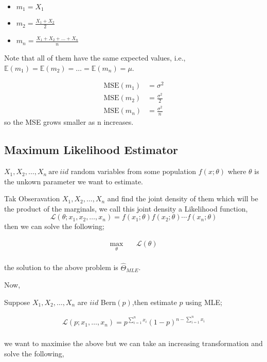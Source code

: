 \documentclass[12pt,a4paper]{article}
\begin{document}
    \begin{itemize}
        \item  \(m_{1}=X_{1}\)
        \item \(m_{2}=\frac{X_{1}+X_{2}}{2}\)
        \item \(m_{n}=\frac{X_{1}+X_{2}+\ldots +X_{n}}{n}\)
    \end{itemize}
    

    Note that all of them have the same expected values, i.e., \(\mathbb{E}(m_{1})=\mathbb{E}(m_{2})=\ldots=\mathbb{E}(m_{n})=\mu\). 
    
    \begin{align*}
        \mathrm{MSE}(m_{1})&=\sigma^2\\
        \mathrm{MSE}(m_{2})&=\frac{\sigma^2}{2}\\
        \mathrm{MSE}(m_{n})&=\frac{\sigma^2}{n}
    \end{align*}
    so the MSE grows smaller as n increases. 
   

    \subsection{Maximum Likelihood Estimator}
    \(X_{1},X_{2},\ldots,X_{n} \ \text{are} \ iid\) random variables from some population \(f(x;\theta )\) where \(\theta\) is the unkown parameter we want to estimate. 
    
    Tak Obseravation \( X_{1},X_{2},\ldots,X_{n}\)  and find the joint density of them which will be the product of the marginals, we call this joint density a Likelihood function,
    \begin{equation*}
        \mathcal{L}(\theta ; x_{1},x_{2},\ldots,x_{n})=f(x_{1};\theta)f(x_{2};\theta) \cdots f(x_{n};\theta)  
    \end{equation*}    
    then we can solve the following;
    \begin{tcolorbox}
    \begin{align*}
         \max_{\theta } & \quad \mathcal{L}(\theta) \\
    \end{align*}
    \end{tcolorbox}
    the solution to the above problem is \(\hat{\Theta}_{MLE}\). 
    
    Now,

    Suppose \(X_{1},X_{2},\ldots,X_{n}\) are \(iid\) Bern\((p)\),then
    estimate \(p\) using MLE;
    \begin{tcolorbox}
    \begin{align*}
        \mathcal{L}(p ; x_{1},\ldots,x_{n})=p^{\sum_{i=1}^{n}x_{i}}(1-p)^{n-\sum_{i=1}^{n}x_{i}}\\
    \end{align*}
    \end{tcolorbox}
    we want to maximise the above but we can take an increasing transformation and solve the following,
\end{document}
